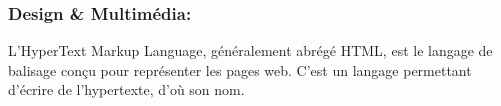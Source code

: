 \documentclass[a4paper]{report}
\begin{document}
\begin{spacing}{2}
\subsubsection{Design \& Multimédia:}
\begin{minipage}{0.2\textwidth}
	\begin{minipage}{\linewidth}
	\end{minipage}
\end{minipage}
\hfill
\begin{minipage}{0.75\textwidth}
	L'HyperText Markup Language, généralement abrégé HTML, est le langage de balisage conçu pour représenter les pages web. C'est un langage permettant d'écrire de l'hypertexte, d'où son nom.\\
\end{minipage}\\


\end{spacing}
\end{document}
